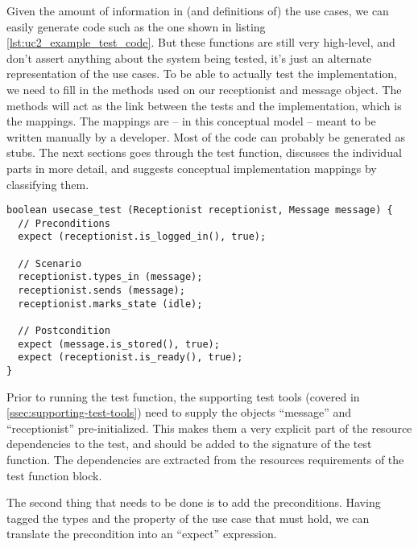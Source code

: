 \noindent Given the amount of information in (and definitions of) the use cases, we can easily generate code such as the one shown in listing \ref{lst:uc2_example_test_code}. But these functions are still very high-level, and don't assert anything about the system being tested, it's just an alternate representation of the use cases. To be able to actually test the implementation, we need to fill in the methods used on our receptionist and message object. The methods will act as the link between the tests and the implementation, which is the mappings. The mappings are -- in this conceptual model -- meant to be written manually by a developer. Most of the code can probably be generated as stubs. The next sections goes through the test function, discusses the individual parts in more detail, and suggests conceptual implementation mappings by classifying them.
\begin{lstlisting}[style=Dart, caption=Suggested structure of generated test case,label={lst:uc2_example_test_code}]
boolean usecase_test (Receptionist receptionist, Message message) {
  // Preconditions
  expect (receptionist.is_logged_in(), true);

  // Scenario
  receptionist.types_in (message);
  receptionist.sends (message);
  receptionist.marks_state (idle);
  
  // Postcondition
  expect (message.is_stored(), true);
  expect (receptionist.is_ready(), true);
}
\end{lstlisting}
Prior to running the test function, the supporting test tools (covered in \ref{ssec:supporting-test-tools}) need to supply the objects ``message'' and ``receptionist'' pre-initialized. This makes them a very explicit part of the resource dependencies to the test, and should be added to the signature of the test function. The dependencies are extracted from the resources requirements of the test function block.\medskip

\noindent The second thing that needs to be done is to add the preconditions. Having tagged the types and the property of the use case that must hold, we can translate the precondition into an ``expect'' expression.\medskip

